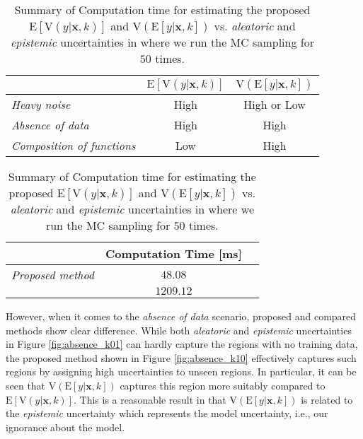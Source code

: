 \documentclass[letterpaper, 10 pt, conference]{ieeeconf}  %
\def\Bx{\mathbf{x}} \def\By{\mathbf{y}} \def\Bp{\mathbf{p}}
\begin{document}
\begin{table}[h!]  \center 
	\begin{tabular}{ l | c | c  } 
                    & $\mathrm{E}[\mathrm{V}(y|\Bx, k)]$ & $\mathrm{V}(\mathrm{E}[y|\Bx, k])$ \\
		\hline \hline
		\textit{Heavy noise}	
			& High 		& High or Low
		\\ 
		\textit{Absence of data}     
			& High 		& High			
		\\
		\textit{Composition of functions}  	
			& Low 		& High
		\\
	\end{tabular}
	\caption{Summary of 
		$\mathrm{E}[\mathrm{V}(y|\Bx, k)]$
		and 
		$\mathrm{V}(\mathrm{E}[y|\Bx, k])$ on 
		\textit{absence of data}, \textit{heavy noise}, and 
		\textit{composition of functions} scenarios.
	}
	\label{tbl:summ}
	\begin{tabular}{ l | c | c  } 
                    & Computation Time [ms]
                  \\
		\hline \hline
		\textit{Proposed method}	
			& $48.08$ 	
		\\ 
		\textit{\cite{Kendall_17}}     
			& $1209.12$ 	
		\\
	\end{tabular}
	\caption{Summary of 
		Computation time for estimating 
		the proposed 
		$\mathrm{E}[\mathrm{V}(y|\Bx, k)]$ 
		and 
		$\mathrm{V}(\mathrm{E}[y|\Bx, k])$
		vs.
		\textit{aleatoric} and \textit{epistemic}
		uncertainties in 
		\cite{Kendall_17} where we run the MC sampling
		for $50$ times. 
	}
	\label{tbl:time}
\end{table}



However, when it comes to the \textit{absence of data} scenario,
proposed and compared methods show clear difference.  
While both \textit{aleatoric} and \textit{epistemic} uncertainties 
in Figure \ref{fig:absence_k01}
can hardly capture the regions with no training data,
the proposed method 
shown in Figure \ref{fig:absence_k10}
effectively captures such regions by assigning 
high uncertainties to unseen regions. 
In particular, it can be seen that $\mathrm{V}(\mathrm{E}[y|\Bx, k])$ 
captures this region more suitably compared to 
$\mathrm{E}[\mathrm{V}(y|\Bx, k)]$. 
This is a reasonable result in that $\mathrm{V}(\mathrm{E}[y|\Bx, k])$
is related to the \textit{epistemic} uncertainty 
which represents the model uncertainty,
i.e., our ignorance about the model. 
\end{document}
